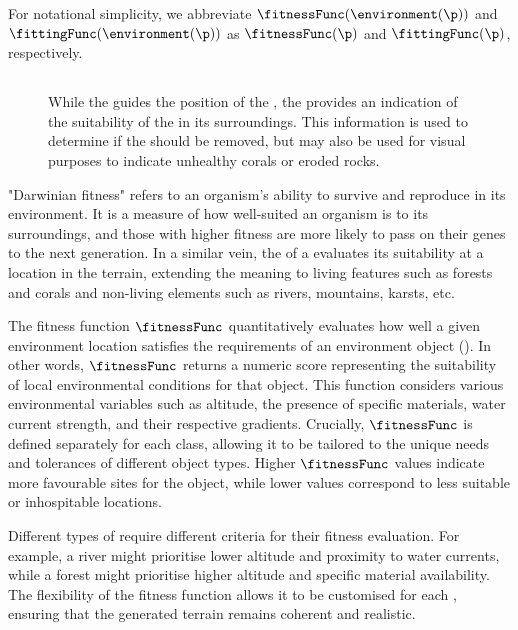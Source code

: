 For notational simplicity, we abbreviate $\fitnessFunc(\environment(\p))$ and $\fittingFunc(\environment(\p))$ as $\fitnessFunc(\p)$ and $\fittingFunc(\p)$, respectively.

\subsection{}

\begin{figure}
\caption{While the  guides the position of the , the  provides an indication of the suitability of the  in its surroundings. This information is used to determine if the  should be removed, but may also be used for visual purposes to indicate unhealthy corals or eroded rocks.}
\label{fig:env-obj-procedural-erosion}
\end{figure}

"Darwinian fitness" refers to an organism's ability to survive and reproduce in its environment. It is a measure of how well-suited an organism is to its surroundings, and those with higher fitness are more likely to pass on their genes to the next generation. In a similar vein, the  of a  evaluates its suitability at a location in the terrain, extending the meaning to living features such as forests and corals and non-living elements such as rivers, mountains, karsts, etc.

The fitness function $\fitnessFunc$ quantitatively evaluates how well a given environment location satisfies the requirements of an environment object (). In other words, $\fitnessFunc$ returns a numeric score representing the suitability of local environmental conditions for that object. This function considers various environmental variables such as altitude, the presence of specific materials, water current strength, and their respective gradients. Crucially, $\fitnessFunc$ is defined separately for each  class, allowing it to be tailored to the unique needs and tolerances of different object types. Higher $\fitnessFunc$ values indicate more favourable sites for the object, while lower values correspond to less suitable or inhospitable locations.

Different types of  require different criteria for their fitness evaluation. For example, a river might prioritise lower altitude and proximity to water currents, while a forest might prioritise higher altitude and specific material availability. The flexibility of the fitness function allows it to be customised for each , ensuring that the generated terrain remains coherent and realistic.

